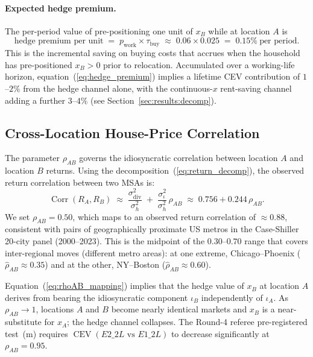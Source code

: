 \paragraph{Expected hedge premium.}
The per-period value of pre-positioning one unit of $x_B$ while at
location $A$ is
\begin{equation}
    \text{hedge premium per unit}
    \;=\;
    p_{\text{work}} \times \tau_{\text{buy}}
    \;\approx\;
    0.06 \times 0.025
    \;=\; 0.15\%\ \text{per period}.
    \label{eq:hedge_premium}
\end{equation}
This is the incremental saving on buying costs that accrues when the
household has pre-positioned $x_B > 0$ prior to relocation.
Accumulated over a working-life horizon, equation~(\ref{eq:hedge_premium})
implies a lifetime CEV contribution of $1$--$2\%$ from the hedge
channel alone, with the continuous-$x$ rent-saving channel adding a further
$3$--$4\%$ (see Section~\ref{sec:results:decomp}).

\subsection{Cross-Location House-Price Correlation}
\label{sec:calibration:rhoAB}

The parameter $\rho_{AB}$ governs the idiosyncratic correlation between
location $A$ and location $B$ returns.
Using the decomposition~(\ref{eq:return_decomp}),
the observed return correlation between two MSAs is:
\begin{equation}
    \operatorname{Corr}(R_A, R_B)
    \;\approx\;
    \frac{\sigma_{\text{div}}^2}{\sigma_h^2}
    \;+\;
    \frac{\sigma_\iota^2}{\sigma_h^2}\,\rho_{AB}
    \;\approx\; 0.756 + 0.244\,\rho_{AB}.
    \label{eq:rhoAB_mapping}
\end{equation}
We set $\rho_{AB} = 0.50$, which maps to an observed return correlation of
$\approx 0.88$, consistent with pairs of geographically proximate
US metros in the Case-Shiller 20-city panel (2000--2023).
This is the midpoint of the $0.30$--$0.70$ range that covers inter-regional
moves (different metro areas): at one extreme, Chicago--Phoenix
($\hat{\rho}_{AB} \approx 0.35$) and at the other,
NY--Boston ($\hat{\rho}_{AB} \approx 0.60$).

Equation~(\ref{eq:rhoAB_mapping}) implies that the hedge value of
$x_B$ at location $A$ derives from bearing the idiosyncratic component
$\iota_B$ independently of $\iota_A$.
As $\rho_{AB} \to 1$, locations $A$ and $B$ become nearly identical
markets and $x_B$ is a near-substitute for $x_A$; the hedge channel
collapses.
The Round-4 referee pre-registered test~(m) requires $\operatorname{CEV}(E2\_2L \text{ vs } E1\_2L)$
to decrease significantly at $\rho_{AB} = 0.95$.

